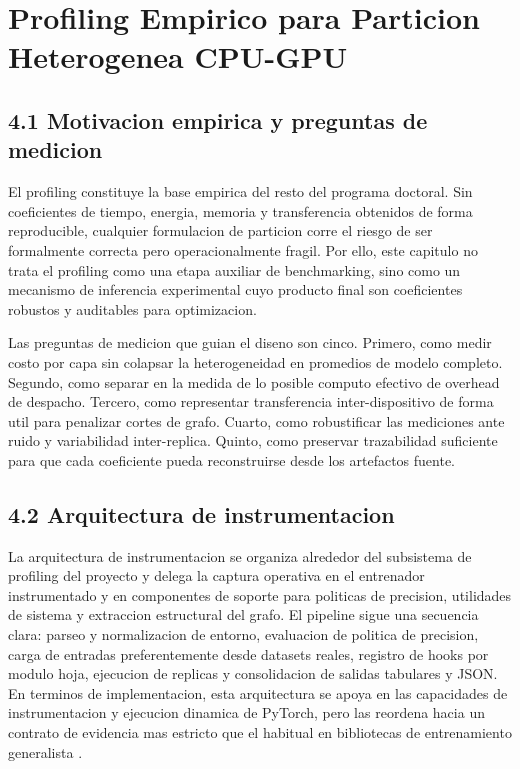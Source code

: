 \chapter{Profiling Empirico para Particion Heterogenea CPU-GPU}

\section{4.1 Motivacion empirica y preguntas de medicion}
El profiling constituye la base empirica del resto del programa doctoral. Sin coeficientes de tiempo, energia, memoria y transferencia obtenidos de forma reproducible, cualquier formulacion de particion corre el riesgo de ser formalmente correcta pero operacionalmente fragil. Por ello, este capitulo no trata el profiling como una etapa auxiliar de benchmarking, sino como un mecanismo de inferencia experimental cuyo producto final son coeficientes robustos y auditables para optimizacion.

Las preguntas de medicion que guian el diseno son cinco. Primero, como medir costo por capa sin colapsar la heterogeneidad en promedios de modelo completo. Segundo, como separar en la medida de lo posible computo efectivo de overhead de despacho. Tercero, como representar transferencia inter-dispositivo de forma util para penalizar cortes de grafo. Cuarto, como robustificar las mediciones ante ruido y variabilidad inter-replica. Quinto, como preservar trazabilidad suficiente para que cada coeficiente pueda reconstruirse desde los artefactos fuente.

\section{4.2 Arquitectura de instrumentacion}
La arquitectura de instrumentacion se organiza alrededor del subsistema de profiling del proyecto y delega la captura operativa en el entrenador instrumentado y en componentes de soporte para politicas de precision, utilidades de sistema y extraccion estructural del grafo. El pipeline sigue una secuencia clara: parseo y normalizacion de entorno, evaluacion de politica de precision, carga de entradas preferentemente desde datasets reales, registro de hooks por modulo hoja, ejecucion de replicas y consolidacion de salidas tabulares y JSON. En terminos de implementacion, esta arquitectura se apoya en las capacidades de instrumentacion y ejecucion dinamica de PyTorch, pero las reordena hacia un contrato de evidencia mas estricto que el habitual en bibliotecas de entrenamiento generalista \cite{paszke2019pytorch}.

